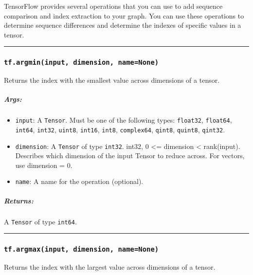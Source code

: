 TensorFlow provides several operations that you can use to add sequence
comparison and index extraction to your graph. You can use these
operations to determine sequence differences and determine the indexes
of specific values in a tensor.

\begin{center}\rule{0.5\linewidth}{\linethickness}\end{center}

\subsubsection{\texorpdfstring{\texttt{tf.argmin(input,\ dimension,\ name=None)}
}{tf.argmin(input, dimension, name=None) }}\label{tf.argmininput-dimension-namenone}

Returns the index with the smallest value across dimensions of a tensor.

\subparagraph{Args: }\label{args-54}

\begin{itemize}
\tightlist
\item
  \texttt{input}: A \texttt{Tensor}. Must be one of the following types:
  \texttt{float32}, \texttt{float64}, \texttt{int64}, \texttt{int32},
  \texttt{uint8}, \texttt{int16}, \texttt{int8}, \texttt{complex64},
  \texttt{qint8}, \texttt{quint8}, \texttt{qint32}.
\item
  \texttt{dimension}: A \texttt{Tensor} of type \texttt{int32}. int32, 0
  \textless{}= dimension \textless{} rank(input). Describes which
  dimension of the input Tensor to reduce across. For vectors, use
  dimension = 0.
\item
  \texttt{name}: A name for the operation (optional).
\end{itemize}

\subparagraph{Returns: }\label{returns-54}

A \texttt{Tensor} of type \texttt{int64}.

\begin{center}\rule{0.5\linewidth}{\linethickness}\end{center}

\subsubsection{\texorpdfstring{\texttt{tf.argmax(input,\ dimension,\ name=None)}
}{tf.argmax(input, dimension, name=None) }}\label{tf.argmaxinput-dimension-namenone}

Returns the index with the largest value across dimensions of a tensor.

